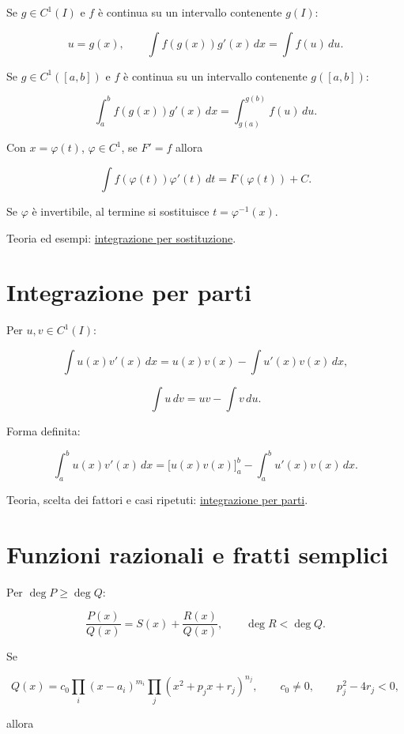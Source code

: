 Se \(g\in C^1(I)\) e \(f\) è continua su un intervallo contenente \(g(I)\):

\[
\displaystyle
u=g(x),
\qquad
\int f(g(x))g'(x)\,dx
=
\int f(u)\,du.
\]

Se \(g\in C^1([a,b])\) e \(f\) è continua su un intervallo contenente \(g([a,b])\):

\[
\displaystyle
\int_a^b f(g(x))g'(x)\,dx
=
\int_{g(a)}^{g(b)}f(u)\,du.
\]

Con \(x=\varphi(t)\), \(\varphi\in C^1\), se \(F'=f\) allora

\[
\displaystyle
\int f(\varphi(t))\varphi'(t)\,dt
=
F(\varphi(t))+C.
\]

Se \(\varphi\) è invertibile, al termine si sostituisce \(t=\varphi^{-1}(x)\).

Teoria ed esempi: \href{https://ingegnerismo.it/matematica/integrazione-per-sostituzione/}{integrazione per sostituzione}.

\section{Integrazione per parti}\label{integrazione-per-parti}

Per \(u,v\in C^1(I)\):

\[
\displaystyle
\int u(x)v'(x)\,dx
=
u(x)v(x)-\int u'(x)v(x)\,dx,
\]

\[
\displaystyle
\int u\,dv=uv-\int v\,du.
\]

Forma definita:

\[
\displaystyle
\int_a^b u(x)v'(x)\,dx
=
\bigl[u(x)v(x)\bigr]_a^b
-\int_a^b u'(x)v(x)\,dx.
\]

Teoria, scelta dei fattori e casi ripetuti: \href{https://ingegnerismo.it/matematica/integrazione-per-parti/}{integrazione per parti}.

\section{Funzioni razionali e fratti semplici}\label{funzioni-razionali-e-fratti-semplici}

Per \(\deg P\ge\deg Q\):

\[
\displaystyle
\frac{P(x)}{Q(x)}
=
S(x)+\frac{R(x)}{Q(x)},
\qquad
\deg R<\deg Q.
\]

Se

\[
\displaystyle
Q(x)
=
c_0\prod_i(x-a_i)^{m_i}
\prod_j(x^2+p_jx+r_j)^{n_j},
\qquad
c_0\ne0,
\qquad
p_j^2-4r_j<0,
\]

allora

